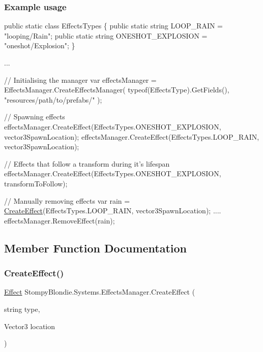 \subsubsection*{Example usage }


\begin{DoxyCode}
\textcolor{keyword}{public} \textcolor{keyword}{static} \textcolor{keyword}{class }EffectsTypes
\{
   \textcolor{keyword}{public} \textcolor{keyword}{static} \textcolor{keywordtype}{string} LOOP\_RAIN = \textcolor{stringliteral}{"looping/Rain"};
   \textcolor{keyword}{public} \textcolor{keyword}{static} \textcolor{keywordtype}{string} ONESHOT\_EXPLOSION = \textcolor{stringliteral}{"oneshot/Explosion"};
\}

...

\textcolor{comment}{// Initialising the manager}
var effectsManager = EffectsManager.CreateEffectsManager(
     typeof(EffectsType).GetFields(),
     \textcolor{stringliteral}{"resources/path/to/prefabs/"}
);

\textcolor{comment}{// Spawning effects}
effectsManager.CreateEffect(EffectsTypes.ONESHOT\_EXPLOSION, vector3SpawnLocation);
effectsManager.CreateEffect(EffectsTypes.LOOP\_RAIN, vector3SpawnLocation);

\textcolor{comment}{// Effects that follow a transform during it's lifespan}
effectsManager.CreateEffect(EffectsTypes.ONESHOT\_EXPLOSION, transformToFollow);

\textcolor{comment}{// Manually removing effects}
var rain = \mbox{\hyperlink{class_stompy_blondie_1_1_systems_1_1_effects_manager_ac8421abe668767bdca76cfdcc61fc398}{CreateEffect}}(EffectsTypes.LOOP\_RAIN, vector3SpawnLocation);
....
effectsManager.RemoveEffect(rain);
\end{DoxyCode}
 

\subsection{Member Function Documentation}
\mbox{\label{class_stompy_blondie_1_1_systems_1_1_effects_manager_ac8421abe668767bdca76cfdcc61fc398}} 
\subsubsection{\texorpdfstring{Create\+Effect()}{CreateEffect()}\hspace{0.1cm}{\footnotesize\ttfamily [1/2]}}
{\footnotesize\ttfamily \mbox{\hyperlink{class_stompy_blondie_1_1_systems_1_1_effect}{Effect}} Stompy\+Blondie.\+Systems.\+Effects\+Manager.\+Create\+Effect (\begin{DoxyParamCaption}\item[{string}]{type,  }\item[{Vector3}]{location }\end{DoxyParamCaption})\hspace{0.3cm}{\ttfamily [inline]}}

